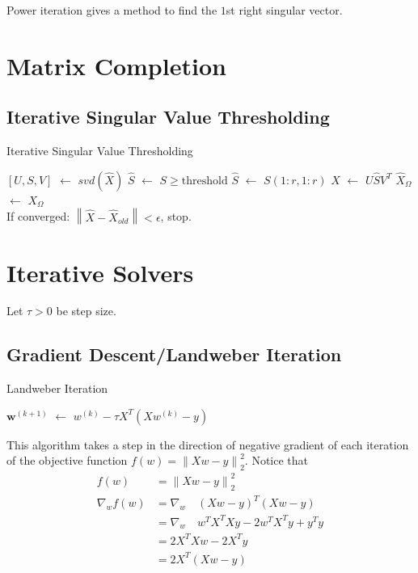 \documentclass[12pt]{article}
\theoremstyle{definition}
\newcommand*\Let[2]{\State #1 $\gets$ #2}
\newcommand{\e}{\epsilon}
\newcommand{\norm}[1]{\left\lVert#1\right\rVert}
\begin{document}
Power iteration gives a method to find the $1$st right singular vector. 

\section{Matrix Completion}
\subsection{Iterative Singular Value Thresholding}
\begin{algorithm}
  \caption{Iterative Singular Value Thresholding}
  \begin{algorithmic}[ht]
     
    	\Let{$[U,S,V]$}{$svd(\hat X)$}
    	\Let{$\hat S $}{$S \geq \text{threshold}$} 
    	\Let{$\hat S $}{$S(1:r,1:r)$} 
    	\Let{$\hat X $}{$U \hat S V^T$}
    	\Let{$\hat X_{\Omega}$}{$X_{\Omega}$}  \\
    	If converged: $\norm{\hat X - \hat X_{old}} < \e$, stop.
    \EndFor
  \end{algorithmic}
\end{algorithm}

\section{Iterative Solvers}
Let $\tau > 0$ be step size.
\subsection{Gradient Descent/Landweber Iteration}
\begin{algorithm}
  \caption{Landweber Iteration}
  \begin{algorithmic}[ht]
    	\Let{$\bm w^{(k+1)}$}{$w^{(k)} - \tau X^T(Xw^{(k)} - y)$}
    \EndFor
  \end{algorithmic}
\end{algorithm}

This algorithm takes a step in the direction of negative gradient of each iteration of the objective function $f(w) = \norm{Xw - y}^2_2$. Notice that
\begin{align*}
	f(w)  &= \norm{Xw -y}^2_2 \\
	\nabla_w f(w) &= \nabla_w \quad (Xw -y)^T (Xw -y) \\
	&= \nabla_w \quad w^T X^T X y - 2w^T X^T y + y^T y \\
	&= 2X^T X w - 2X^T y \\
	&= 2X^T(Xw -y)
\end{align*}
\end{document}
